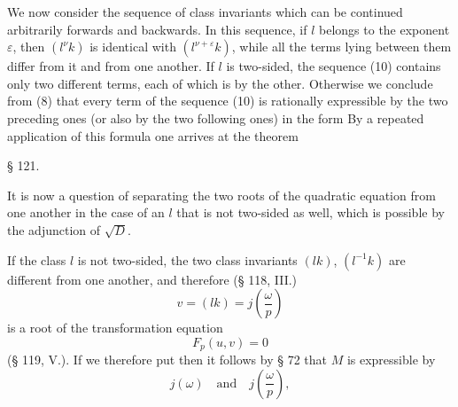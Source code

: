 We now consider the sequence of class invariants
which can be continued arbitrarily forwards and backwards. In this
sequence, if $l$ belongs to the exponent $\varepsilon$, then $(l^{\nu}k)$ is
identical with $(l^{\nu+\varepsilon}k)$, while all the terms lying between
them differ from it and from one another. If $l$ is two-sided, the
sequence (10) contains only two different terms, each of which is
 by the other. Otherwise we conclude from (8)
that every term of the sequence (10) is rationally expressible by the
two preceding ones (or also by the two following ones) in the form
By a repeated application of this formula one arrives at the theorem


\begin{center}
§ 121. 
\end{center}

It is now a question of separating the two roots of the quadratic
equation from one another in the case of an $l$ that is not two-sided
as well, which is possible by the adjunction of $\sqrt{D}$.

If the class $l$ is not two-sided, the two class invariants
$(lk)$, $(l^{-1}k)$ are different from one another, and therefore
(§ 118, III.)
\[
v = (lk) = j\left(\frac{\omega}{p}\right)
\]
is a  root of the transformation equation
\[
F_p(u, v) = 0
\]
(§ 119, V.). If we therefore put
then it follows by § 72 that $M$ is  expressible by
\[
j(\omega) \quad \text{and} \quad j\left(\frac{\omega}{p}\right),
\]
